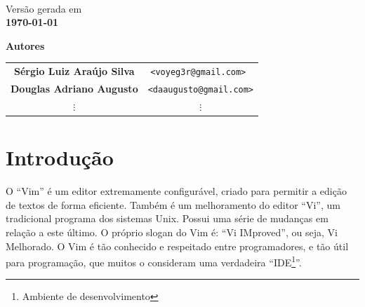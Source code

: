 \documentclass[10pt,a4paper,openany]{book}
\begin{document}
\begin{titlepage}
\begin{center}
\begin{flushright}
\begin{minipage}[t]{8cm}
   \end{minipage} \\
   \end{flushright}

   \vspace{3cm}

   {\small Versão gerada em \\ \bf \today}
\end{center}
\end{titlepage}

\newpage

\begin{center}
{\Huge \bf Autores}

\vspace{2cm}

\begin{tabular}{cc}

\bf Sérgio Luiz Araújo Silva & \tt <voyeg3r@gmail.com> \\
\bf Douglas Adriano Augusto & \tt <daaugusto@gmail.com>\\
$\vdots$ & $\vdots$ \\

\end{tabular}

\end{center}

\newpage
\tableofcontents

\chapter{Introdução}

O ``Vim'' é um editor extremamente configurável, criado para permitir a edição
de textos de forma eficiente. Também é um melhoramento do editor ``Vi'', um
tradicional programa dos sistemas Unix. Possui uma série de mudanças em relação
a este último. O próprio slogan do Vim é: ``Vi IMproved'', ou seja, Vi Melhorado.  O Vim é
tão conhecido e respeitado entre programadores, e tão útil para programação,
que muitos o consideram uma verdadeira ``IDE\footnote{Ambiente de
desenvolvimento}''.
\end{document}
